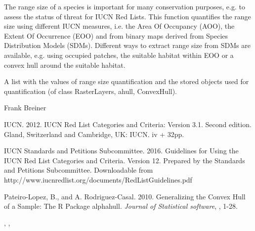 \documentclass[a4paper]{book}
\begin{document}
%
\begin{Details}\relax
The range size of a species is important for many conservation purposes, e.g. to assess the status of threat for IUCN Red Lists. This function quantifies the range size using different IUCN measures, i.e. the Area Of Occupancy (AOO), the Extent Of Occurrence (EOO) and from binary maps derived from Species Distribution Models (SDMs). Different ways to extract range size from SDMs are available, e.g. using occupied patches, the suitable habitat within EOO or a convex hull around the suitable habitat.
\end{Details}
%
\begin{Value}
A list with the values of range size quantification and the stored objects used for quantification (of class RasterLayers, ahull, ConvexHull).
\end{Value}
%
\begin{Author}\relax
Frank Breiner 
\end{Author}
%
\begin{References}\relax

IUCN. 2012. IUCN Red List Categories and Criteria: Version 3.1. Second edition. Gland, Switzerland and Cambridge, UK: IUCN. iv + 32pp.

IUCN Standards and Petitions Subcommittee. 2016. Guidelines for Using the IUCN Red List Categories and Criteria. Version 12. Prepared by the Standards and Petitions Subcommittee. Downloadable from http://www.iucnredlist.org/documents/RedListGuidelines.pdf

Pateiro-Lopez, B., and A. Rodriguez-Casal. 2010. Generalizing the Convex Hull of a Sample: The R Package alphahull. \emph{Journal of Statistical software}, , 1-28.
\end{References}
%
\begin{SeeAlso}\relax
{}, , 
\end{SeeAlso}
%
\end{document}
